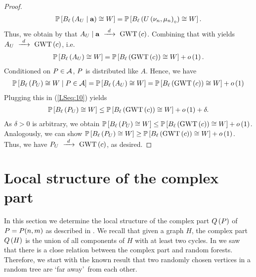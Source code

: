\begin{proof}
\begin{align*}
\mathbb{P}\left[B_{\ell}\left(A_U \mid \mathbf{a}\right)\cong W\right]=\mathbb{P}\left[B_{\ell}\left(U\left(\nu_n, \mu_n\right)_\circ\right)\cong W\right].
\end{align*}
Thus, we obtain by  that $A_U \mid \mathbf{a}~\xrightarrow{~d~}~\operatorname{GWT}\left(c\right)$. Combining that with  yields $A_U~\xrightarrow{~d~}~\operatorname{GWT}\left(c\right)$, i.e.
\begin{align*}
\mathbb{P}\left[B_{\ell}\left(A_U\right)\cong W\right]=\mathbb{P}\left[B_{\ell}\left(\operatorname{GWT}\left(c\right)\right)\cong W\right]+o\left(1\right).  
\end{align*}
Conditioned on $P\in\mathcal{A}$, $P$ is distributed like $A$. Hence, we have 
\begin{align*}
\mathbb{P}\left[B_{\ell}\left(P_U\right)\cong W \;\middle|\; P\in\mathcal{A}\right]=\mathbb{P}\left[B_{\ell}\left(A_U\right)\cong W\right]=\mathbb{P}\left[B_{\ell}\left(\operatorname{GWT}\left(c\right)\right)\cong W\right]+o\left(1\right)    
\end{align*}
Plugging this in (\ref{LSeq:10}) yields
\begin{align*}
\mathbb{P}\left[B_{\ell}\left(P_U\right)\cong W\right]
\leq
\mathbb{P}\left[B_{\ell}\left(\operatorname{GWT}\left(c\right)\right)\cong W\right]+o\left(1\right)+\delta.
\end{align*}
As $\delta>0$ is arbitrary, we obtain $\mathbb{P}\left[B_{\ell}\left(P_U\right)\cong W\right]\leq \mathbb{P}\left[B_{\ell}\left(\operatorname{GWT}\left(c\right)\right)\cong W\right]+o\left(1\right)$. Analogously, we can show $\mathbb{P}\left[B_{\ell}\left(P_U\right)\cong W\right]\geq \mathbb{P}\left[B_{\ell}\left(\operatorname{GWT}\left(c\right)\right)\cong W\right]+o\left(1\right)$. Thus, we have $P_U~\xrightarrow{~d~}~\operatorname{GWT}\left(c\right)$, as desired.
\end{proof}

\section{Local structure of the complex part}\label{LSsec:local_complex}
In this section we determine the local structure of the complex part $Q\left(P\right)$ of $P=P(n,m)$ as described in . We recall that given a graph $H$, the complex part $Q\left(H\right)$ is the union of all components of $H$ with at least two cycles. In  we saw that there is a close relation between the complex part and random forests. Therefore, we start with the known result that two randomly chosen vertices in a random tree are \lq far away\rq\ from each other.

